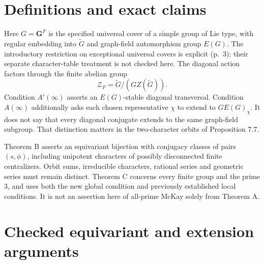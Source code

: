 \documentclass[10pt]{article}
\begin{document}
\section*{Definitions and exact claims}
Here \(G=\mathbf G^F\) is the specified universal cover of a simple group of Lie type, with regular embedding into \(\widetilde G\) and graph-field automorphism group \(E(G)\). The introductory restriction on exceptional universal covers is explicit (p. 3); their separate character-table treatment is not checked here. The diagonal action factors through the finite abelian group \[\mathcal Z_F=\widetilde G/(GZ(\widetilde G)).\] Condition \(A'(\infty)\) asserts an \(E(G)\)-stable diagonal transversal. Condition \(A(\infty)\) additionally asks each chosen representative \(\chi\) to extend to \(G E(G)_\chi\). It does not say that every diagonal conjugate extends to the same graph-field subgroup. That distinction matters in the two-character orbits of Proposition 7.7.\par
Theorem B asserts an equivariant bijection with conjugacy classes of pairs \((s,\phi)\), including unipotent characters of possibly disconnected finite centralizers. Orbit sums, irreducible characters, rational series and geometric series must remain distinct. Theorem C concerns every finite group and the prime \(3\), and uses both the new global condition and previously established local conditions. It is not an assertion here of all-prime McKay solely from Theorem A.\par
\section*{Checked equivariant and extension arguments}
\end{document}
